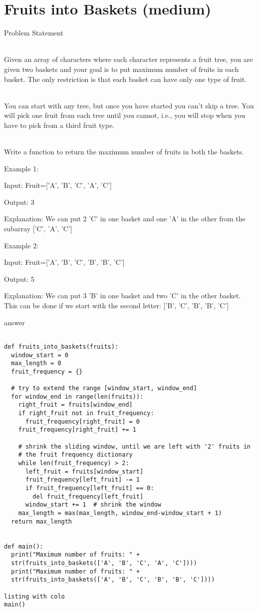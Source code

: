 \section{Fruits into Baskets (medium)}

Problem Statement

\noindent
\\Given an array of characters where each character represents a fruit tree, you are given two baskets and your goal is to put maximum number of fruits in each basket. The only restriction is that each basket can have only one type of fruit.

\noindent
\\You can start with any tree, but once you have started you can’t skip a tree. You will pick one fruit from each tree until you cannot, i.e., you will stop when you have to pick from a third fruit type.

\noindent
\\Write a function to return the maximum number of fruits in both the baskets.

Example 1:

Input: Fruit=['A', 'B', 'C', 'A', 'C']

Output: 3

Explanation: We can put 2 'C' in one basket and one 'A' in the other from the subarray ['C', 'A', 'C']

Example 2:

Input: Fruit=['A', 'B', 'C', 'B', 'B', 'C']

Output: 5

Explanation: We can put 3 'B' in one basket and two 'C' in the other basket. 
This can be done if we start with the second letter: ['B', 'C', 'B', 'B', 'C']


answer

\lstset{language=Python}
\begin{lstlisting}

def fruits_into_baskets(fruits):
  window_start = 0
  max_length = 0
  fruit_frequency = {}

  # try to extend the range [window_start, window_end]
  for window_end in range(len(fruits)):
    right_fruit = fruits[window_end]
    if right_fruit not in fruit_frequency:
      fruit_frequency[right_fruit] = 0
    fruit_frequency[right_fruit] += 1

    # shrink the sliding window, until we are left with '2' fruits in 
    # the fruit frequency dictionary
    while len(fruit_frequency) > 2:
      left_fruit = fruits[window_start]
      fruit_frequency[left_fruit] -= 1
      if fruit_frequency[left_fruit] == 0:
        del fruit_frequency[left_fruit]
      window_start += 1  # shrink the window
    max_length = max(max_length, window_end-window_start + 1)
  return max_length


def main():
  print("Maximum number of fruits: " + 
  str(fruits_into_baskets(['A', 'B', 'C', 'A', 'C'])))
  print("Maximum number of fruits: " + 
  str(fruits_into_baskets(['A', 'B', 'C', 'B', 'B', 'C'])))

listing with colo
main()
    
\end{lstlisting}